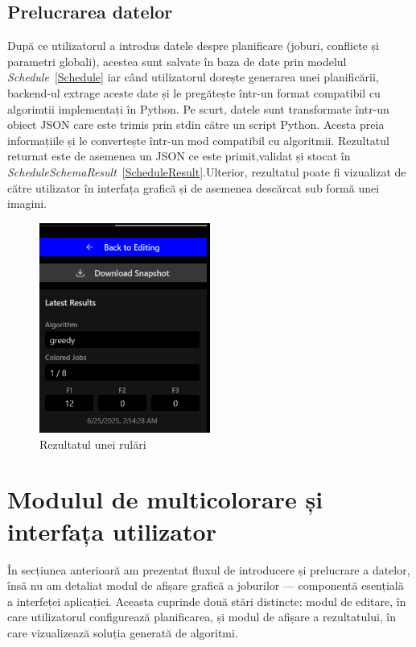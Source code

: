 \subsection{Prelucrarea datelor}
După ce utilizatorul a introdus datele despre planificare (joburi, conflicte și parametri globali), acestea sunt salvate în baza de date prin modelul \textit{Schedule}~\ref{Schedule} iar când utilizatorul dorește generarea unei planificării, backend-ul extrage aceste date și le pregătește într-un format compatibil cu algorimtii implementați în Python. Pe scurt, datele sunt transformate într-un obiect JSON care este trimis prin stdin către un script Python. Acesta preia informațiile și le convertește într-un mod compatibil cu algoritmii. Rezultatul returnat este de asemenea un JSON ce este primit,validat și stocat în \textit{ScheduleSchemaResult}~\ref{ScheduleResult}.Ulterior, rezultatul poate fi vizualizat de către utilizator în interfața grafică și de asemenea descărcat sub formă unei imagini.

\begin{figure}[h]
    \centering
    \includegraphics[width=0.5\textwidth]{images/Rezultat.png}
    \caption{Rezultatul unei rulări}\label{fig:Rezultat}
\end{figure}

\section{Modulul de multicolorare și interfața utilizator}

În secțiunea anterioară am prezentat fluxul de introducere și prelucrare a datelor, însă nu am detaliat modul de afișare grafică a joburilor — componentă esențială a interfeței aplicației. Aceasta cuprinde două stări distincte: modul de editare, în care utilizatorul configurează planificarea, și modul de afișare a rezultatului, în care vizualizează soluția generată de algoritmi.

